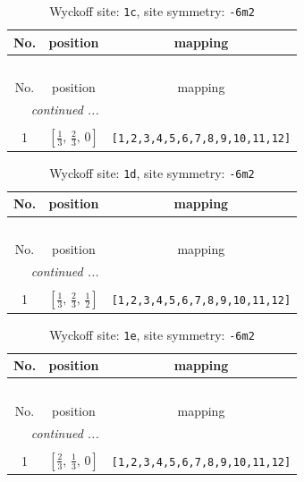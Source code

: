 \documentclass[fleqn,8pt]{jsarticle}
\begin{document}
\begin{longtable}{ccc}
\caption{Wyckoff site: {\tt 1c}, site symmetry: {\tt -6m2}}
 \\
 \hline \hline
No. & position & mapping \\ \hline \endfirsthead

\multicolumn{2}{l}{\tablename\ \thetable{}} \\
 \hline \hline
No. & position & mapping \\ \hline \endhead

 \hline \hline
\multicolumn{2}{r}{\footnotesize\it continued ...} \\ \endfoot

 \hline \hline
\multicolumn{2}{r}{} \\ \endlastfoot

1 & $\left[ \frac{1}{3},\, \frac{2}{3},\, 0 \right]$ & {\tt [1,2,3,4,5,6,7,8,9,10,11,12]} \\
\end{longtable}
\renewcommand{\arraystretch}{1.2}
\begin{longtable}{ccc}
\caption{Wyckoff site: {\tt 1d}, site symmetry: {\tt -6m2}}
 \\
 \hline \hline
No. & position & mapping \\ \hline \endfirsthead

\multicolumn{2}{l}{\tablename\ \thetable{}} \\
 \hline \hline
No. & position & mapping \\ \hline \endhead

 \hline \hline
\multicolumn{2}{r}{\footnotesize\it continued ...} \\ \endfoot

 \hline \hline
\multicolumn{2}{r}{} \\ \endlastfoot

1 & $\left[ \frac{1}{3},\, \frac{2}{3},\, \frac{1}{2} \right]$ & {\tt [1,2,3,4,5,6,7,8,9,10,11,12]} \\
\end{longtable}
\renewcommand{\arraystretch}{1.2}
\begin{longtable}{ccc}
\caption{Wyckoff site: {\tt 1e}, site symmetry: {\tt -6m2}}
 \\
 \hline \hline
No. & position & mapping \\ \hline \endfirsthead

\multicolumn{2}{l}{\tablename\ \thetable{}} \\
 \hline \hline
No. & position & mapping \\ \hline \endhead

 \hline \hline
\multicolumn{2}{r}{\footnotesize\it continued ...} \\ \endfoot

 \hline \hline
\multicolumn{2}{r}{} \\ \endlastfoot

1 & $\left[ \frac{2}{3},\, \frac{1}{3},\, 0 \right]$ & {\tt [1,2,3,4,5,6,7,8,9,10,11,12]} \\
\end{longtable}
\end{document}
